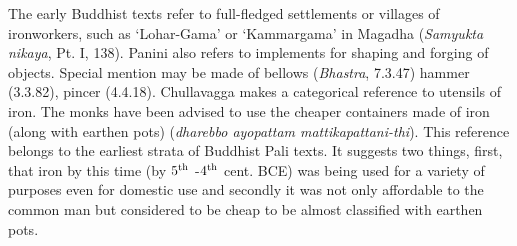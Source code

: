 
The early Buddhist texts refer to full-fledged settlements or villages of ironworkers, such as `Lohar-Gama' or `Kammargama' in Magadha ({\it Samyukta nikaya}, Pt. I, 138). Panini also refers to implements for shaping and forging of objects. Special mention may be made of bellows ({\it Bhastra}, 7.3.47) hammer (3.3.82), pincer (4.4.18).  Chullavagga makes a categorical reference to utensils of iron. The monks have been advised to use the cheaper containers made of iron (along with earthen pots) ({\it dharebbo ayopattam mattikapattani-thi}). This reference belongs to the earliest strata of Buddhist Pali texts. It suggests two things, first, that iron by this time (by $5^{\rm th}$ -$4^{\rm th}$ cent. BCE) was being used for a variety of purposes even for domestic use and secondly it was not only affordable to the common man but considered to be cheap to be almost classified with earthen pots. 


